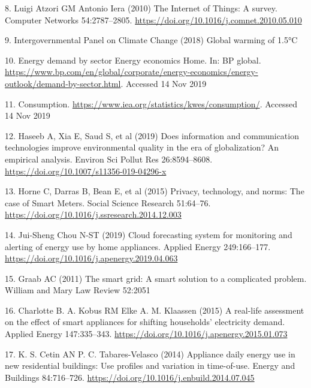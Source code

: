 \documentclass[11pt,]{article}
\begin{document}
\leavevmode\hypertarget{ref-luigiatzoriInternetThingsSurvey2010}{}%
8. Luigi Atzori GM Antonio Iera (2010) The Internet of Things: A survey.
Computer Networks 54:2787--2805.
\url{https://doi.org/10.1016/j.comnet.2010.05.010}

\leavevmode\hypertarget{ref-intergovernmentalpanelonclimatechangeGlobalWarming2018}{}%
9. Intergovernmental Panel on Climate Change (2018) Global warming of
1.5°C

\leavevmode\hypertarget{ref-EnergyDemandSector}{}%
10. Energy demand by sector \textbar{} Energy economics \textbar{} Home.
In: BP global.
\url{https://www.bp.com/en/global/corporate/energy-economics/energy-outlook/demand-by-sector.html}.
Accessed 14 Nov 2019

\leavevmode\hypertarget{ref-Consumption}{}%
11. Consumption. \url{https://www.iea.org/statistics/kwes/consumption/}.
Accessed 14 Nov 2019

\leavevmode\hypertarget{ref-haseebDoesInformationCommunication2019}{}%
12. Haseeb A, Xia E, Saud S, et al (2019) Does information and
communication technologies improve environmental quality in the era of
globalization? An empirical analysis. Environ Sci Pollut Res
26:8594--8608. \url{https://doi.org/10.1007/s11356-019-04296-x}

\leavevmode\hypertarget{ref-hornePrivacyTechnologyNorms2015}{}%
13. Horne C, Darras B, Bean E, et al (2015) Privacy, technology, and
norms: The case of Smart Meters. Social Science Research 51:64--76.
\url{https://doi.org/10.1016/j.ssresearch.2014.12.003}

\leavevmode\hypertarget{ref-jui-shengchouCloudForecastingSystem2019}{}%
14. Jui-Sheng Chou N-ST (2019) Cloud forecasting system for monitoring
and alerting of energy use by home appliances. Applied Energy
249:166--177. \url{https://doi.org/10.1016/j.apenergy.2019.04.063}

\leavevmode\hypertarget{ref-graabSmartGridSmart2011}{}%
15. Graab AC (2011) The smart grid: A smart solution to a complicated
problem. William and Mary Law Review 52:2051

\leavevmode\hypertarget{ref-charlotteb.a.kobusReallifeAssessmentEffect2015}{}%
16. Charlotte B. A. Kobus RM Elke A. M. Klaassen (2015) A real-life
assessment on the effect of smart appliances for shifting households'
electricity demand. Applied Energy 147:335--343.
\url{https://doi.org/10.1016/j.apenergy.2015.01.073}

\leavevmode\hypertarget{ref-k.s.cetinApplianceDailyEnergy2014}{}%
17. K. S. Cetin AN P. C. Tabares-Velasco (2014) Appliance daily energy
use in new residential buildings: Use profiles and variation in
time-of-use. Energy and Buildings 84:716--726.
\url{https://doi.org/10.1016/j.enbuild.2014.07.045}
\end{document}
